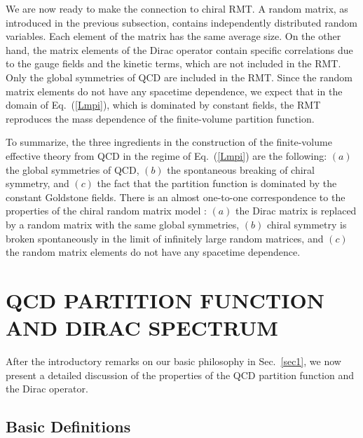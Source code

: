 We are now ready to make the connection to chiral RMT.  A random
matrix, as introduced in the previous subsection, contains
independently distributed random variables.  Each element of the
matrix has the same average size.  On the other hand, the matrix
elements of the Dirac operator contain specific correlations due to
the gauge fields and the kinetic terms, which are not included in
the RMT.  Only the global symmetries of QCD are included
in the RMT. Since the
random matrix elements do not have any spacetime dependence, we
expect that in the domain of Eq.~(\ref{Lmpi}), which is dominated by constant
fields, the RMT reproduces the mass dependence of the
finite-volume partition function.

To summarize, the three ingredients in the construction of the
finite-volume effective theory from QCD in the regime of
Eq.~(\ref{Lmpi}) are 
the following: $(a)$ the global symmetries of QCD, $(b)$ the spontaneous
breaking of chiral symmetry, and $(c)$ the fact that the partition
function is dominated by the constant Goldstone fields.  There is an
almost one-to-one correspondence to the properties of the chiral
random matrix model \cite{Shur93}: $(a)$ the Dirac matrix is replaced by
a random matrix with the same global symmetries, $(b)$ chiral symmetry
is broken spontaneously in the limit of infinitely large random
matrices, and $(c)$ the random matrix elements
do not have any spacetime dependence.


\section{QCD PARTITION FUNCTION AND DIRAC SPECTRUM}
\label{sec:QCD}

After the introductory remarks on our basic philosophy in
Sec.~\ref{sec1}, we now present a detailed discussion of the
properties of the QCD partition function and the Dirac operator.

\subsection{Basic Definitions} 

